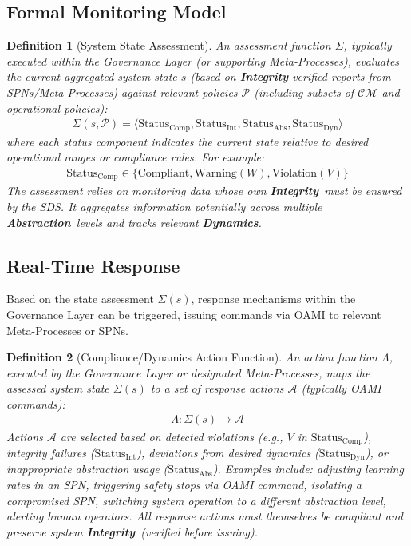 \documentclass[12pt,a4paper]{report}
\newtheorem{definition}{Definition}[section]
\newcommand{\Integrity}{\textbf{Integrity}}
\newcommand{\Abstraction}{\textbf{Abstraction}}
\newcommand{\Dynamics}{\textbf{Dynamics}}
\begin{document}
	\subsection{Formal Monitoring Model}
	\label{sec:2-11-1}
	
	\begin{definition}[System State Assessment]
		\label{def:state_assessment}
		An assessment function $\Sigma$, typically executed within the Governance Layer (or supporting Meta-Processes), evaluates the current aggregated system state $s$ (based on \Integrity-verified reports from SPNs/Meta-Processes) against relevant policies $\mathcal{P}$ (including subsets of $\mathcal{CM}$ and operational policies):
		\begin{align}
			\Sigma(s, \mathcal{P}) = \langle \text{Status}_{\text{Comp}}, \text{Status}_{\text{Int}}, \text{Status}_{\text{Abs}}, \text{Status}_{\text{Dyn}} \rangle
		\end{align}
		where each status component indicates the current state relative to desired operational ranges or compliance rules. For example:
		\begin{align}
			\text{Status}_{\text{Comp}} \in \{\text{Compliant}, \text{Warning}(W), \text{Violation}(V)\}
		\end{align}
		The assessment relies on monitoring data whose own \Integrity\ must be ensured by the SDS. It aggregates information potentially across multiple \Abstraction\ levels and tracks relevant \Dynamics.
	\end{definition}
	
	\subsection{Real-Time Response}
	\label{sec:2-11-2}
	
	Based on the state assessment $\Sigma(s)$, response mechanisms within the Governance Layer can be triggered, issuing commands via OAMI to relevant Meta-Processes or SPNs.
	
	\begin{definition}[Compliance/Dynamics Action Function]
		\label{def:response_action}
		An action function $\Lambda$, executed by the Governance Layer or designated Meta-Processes, maps the assessed system state $\Sigma(s)$ to a set of response actions $\mathcal{A}$ (typically OAMI commands):
		\begin{align}
			\Lambda: \Sigma(s) \rightarrow \mathcal{A}
		\end{align}
		Actions $\mathcal{A}$ are selected based on detected violations (e.g., $V$ in $\text{Status}_{\text{Comp}}$), integrity failures ($\text{Status}_{\text{Int}}$), deviations from desired dynamics ($\text{Status}_{\text{Dyn}}$), or inappropriate abstraction usage ($\text{Status}_{\text{Abs}}$). Examples include: adjusting learning rates in an SPN, triggering safety stops via OAMI command, isolating a compromised SPN, switching system operation to a different abstraction level, alerting human operators. All response actions must themselves be compliant and preserve system \Integrity\ (verified before issuing).
	\end{definition}
	
\end{document}
